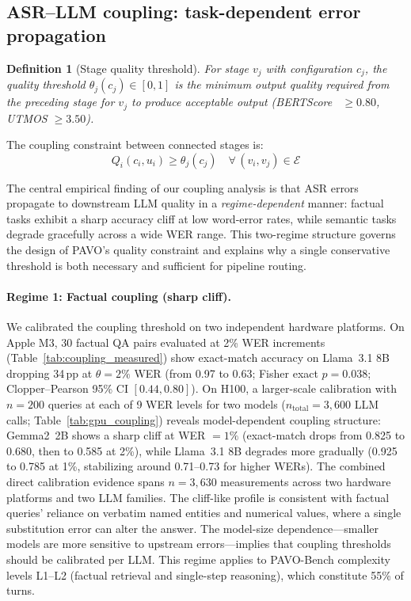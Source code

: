 \documentclass{article}
\newtheorem{definition}{Definition}
\begin{document}
\subsection{ASR--LLM coupling: task-dependent error propagation}
\label{sec:coupling}

\begin{definition}[Stage quality threshold]
For stage $v_j$ with configuration $c_j$, the quality threshold $\theta_j(c_j)\in[0,1]$ is the minimum output quality required from the preceding stage for $v_j$ to produce acceptable output (BERTScore~\citep{zhang2020bertscore,devlin2019bert} $\geq 0.80$, UTMOS $\geq 3.50$).
\end{definition}

The coupling constraint between connected stages is:
\begin{equation}
Q_i(c_i,u_i) \geq \theta_j(c_j) \quad \forall\,(v_i,v_j)\in\mathcal{E}
\label{eq:coupling}
\end{equation}

The central empirical finding of our coupling analysis is that ASR errors propagate to downstream LLM quality in a \emph{regime-dependent} manner: factual tasks exhibit a sharp accuracy cliff at low word-error rates, while semantic tasks degrade gracefully across a wide WER range. This two-regime structure governs the design of PAVO's quality constraint and explains why a single conservative threshold is both necessary and sufficient for pipeline routing.

\paragraph{Regime 1: Factual coupling (sharp cliff).}
We calibrated the coupling threshold on two independent hardware platforms. On Apple M3, 30 factual QA pairs evaluated at 2\% WER increments (Table~\ref{tab:coupling_measured}) show exact-match accuracy on Llama~3.1 8B dropping 34\,pp at $\theta = 2\%$ WER (from 0.97 to 0.63; Fisher exact $p = 0.038$; Clopper--Pearson 95\% CI $[0.44, 0.80]$). On H100, a larger-scale calibration with $n=200$ queries at each of 9 WER levels for two models ($n_{\text{total}} = 3{,}600$ LLM calls; Table~\ref{tab:gpu_coupling}) reveals model-dependent coupling structure: Gemma2~2B shows a sharp cliff at WER $= 1\%$ (exact-match drops from 0.825 to 0.680, then to 0.585 at 2\%), while Llama~3.1 8B degrades more gradually (0.925 to 0.785 at 1\%, stabilizing around 0.71--0.73 for higher WERs). The combined direct calibration evidence spans $n = 3{,}630$ measurements across two hardware platforms and two LLM families. The cliff-like profile is consistent with factual queries' reliance on verbatim named entities and numerical values, where a single substitution error can alter the answer. The model-size dependence---smaller models are more sensitive to upstream errors---implies that coupling thresholds should be calibrated per LLM. This regime applies to PAVO-Bench complexity levels L1--L2 (factual retrieval and single-step reasoning), which constitute 55\% of turns.
\end{document}
